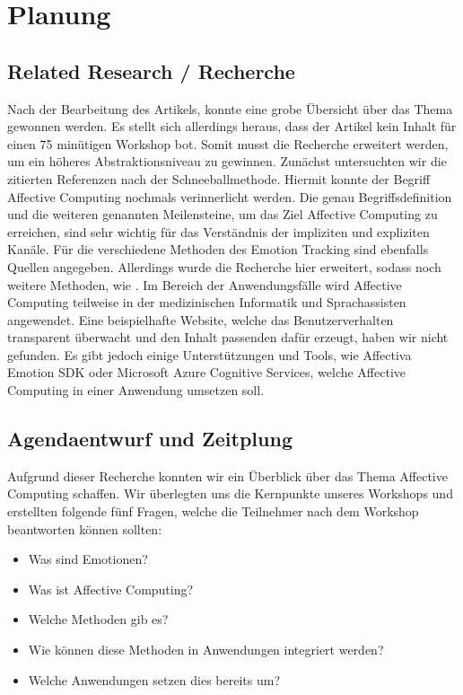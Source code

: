 \section{Planung}


\subsection{Related Research / Recherche }

Nach der Bearbeitung des Artikels, konnte eine grobe Übersicht über das Thema gewonnen werden. Es stellt sich allerdings heraus, dass der Artikel kein Inhalt für einen 75 minütigen Workshop bot. Somit musst die Recherche erweitert werden, um ein höheres Abstraktionsniveau zu gewinnen. Zunächst untersuchten wir die zitierten Referenzen nach der Schneeballmethode. Hiermit konnte der Begriff Affective Computing\cite{Picard} nochmals verinnerlicht werden. Die genau Begriffsdefinition und die weiteren genannten Meilensteine, um das Ziel Affective Computing zu erreichen, sind sehr wichtig für das Verständnis der impliziten und expliziten Kanäle\cite{KimNS}. Für die verschiedene Methoden des Emotion Tracking sind ebenfalls Quellen angegeben\cite{cowie}\cite{zeng}\cite{lee}. Allerdings wurde die Recherche hier erweitert, sodass noch weitere Methoden, wie \cite{AutoEmotion} \cite{Carlos}. Im Bereich der Anwendungsfälle wird Affective Computing teilweise in der medizinischen Informatik\cite{medicine} und Sprachassisten\cite{sprachassi} angewendet. Eine beispielhafte Website, welche das Benutzerverhalten transparent überwacht und den Inhalt passenden dafür erzeugt, haben wir nicht gefunden. Es gibt jedoch einige Unterstützungen und Tools, wie Affectiva Emotion SDK\cite{affectiva} oder Microsoft Azure Cognitive Services\cite{MicrosoftAzure}, welche Affective Computing in einer Anwendung umsetzen soll.


\subsection{Agendaentwurf und Zeitplung}
Aufgrund dieser Recherche konnten wir ein Überblick über das Thema Affective Computing schaffen. Wir überlegten uns die Kernpunkte unseres Workshops und erstellten folgende fünf Fragen, welche die Teilnehmer nach dem Workshop beantworten können sollten:

\begin{itemize}
	\item Was sind Emotionen?
	\item Was ist Affective Computing?
	\item Welche Methoden gib es?
	\item Wie können diese Methoden in Anwendungen integriert werden?
	\item Welche Anwendungen setzen dies bereits um? 
\end{itemize}


